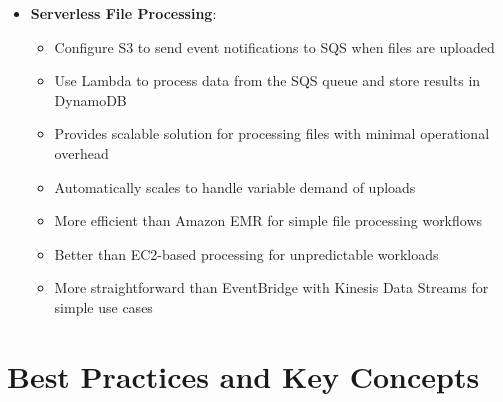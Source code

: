 \documentclass[11pt,a4paper]{report}
\begin{document}
\begin{itemize}
\begin{itemize}
\begin{itemize}
\begin{itemize}
  \item Apply resource-based policies to the Lambda function
  \item Use lambda:InvokeFunction as the specific action permission
  \item Specify Service: events.amazonaws.com as the principal
\end{itemize}
  \item Follows least privilege principle by limiting exactly what service can invoke the function
  \item More secure than using wildcard (*) permissions which grant excessive access
  \item More appropriate than execution roles which control what the function can access, not what can invoke it
  \item Avoids overly permissive lambda:* action which violates least privilege principle
  \item Creates proper security boundary between the event source and Lambda function
  \item Essential for secure serverless architectures with event-driven workflows
\end{itemize}
\end{itemize}
  \item \textbf{Serverless File Processing}:
\begin{itemize}
  \item Configure S3 to send event notifications to SQS when files are uploaded
  \item Use Lambda to process data from the SQS queue and store results in DynamoDB
  \item Provides scalable solution for processing files with minimal operational overhead
  \item Automatically scales to handle variable demand of uploads
  \item More efficient than Amazon EMR for simple file processing workflows
  \item Better than EC2-based processing for unpredictable workloads
  \item More straightforward than EventBridge with Kinesis Data Streams for simple use cases
\end{itemize}
\end{itemize}


\chapter{Best Practices and Key Concepts}
\end{document}
